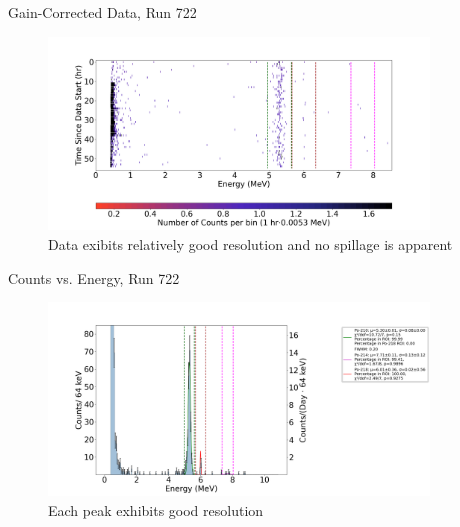 \documentclass[aspectratio=169]{beamer}
\begin{document}
\begin{frame}{Gain-Corrected Data, Run 722}
    \begin{figure}
        \begin{center}
            \includegraphics[width=0.9\textwidth]
            {assets/722/CD.png}
            \caption{Data exibits relatively good resolution and no spillage is apparent}
        \end{center}
    \end{figure}
\end{frame}

\begin{frame}{Counts vs. Energy, Run 722}
    \begin{figure}
        \begin{center}
            \includegraphics[width=0.9\textwidth]
            {assets/722/CvE.png}
            \caption{Each peak exhibits good resolution}
        \end{center}
    \end{figure}
\end{frame}
\end{document}
